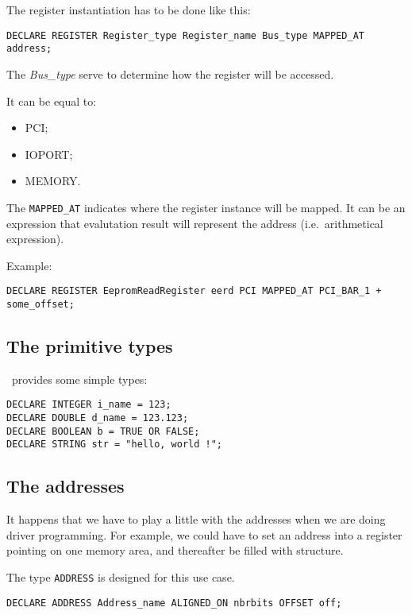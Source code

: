 \documentclass[american]{rtxreport}
\begin{document}
The register instantiation has to be done like this:
\begin{lstlisting}[caption=Register instanciation]
DECLARE REGISTER Register_type Register_name Bus_type MAPPED_AT address;
\end{lstlisting}

The \emph{Bus\_type} serve to determine how the register will be accessed.

It can be equal to:
\begin{itemize}
	\item PCI;
	\item IOPORT;
	\item MEMORY.
\end{itemize}

The \texttt{MAPPED\_AT} indicates where the register instance will be mapped. It can be an expression that evalutation result
will represent the address (i.e.\ arithmetical expression).


Example:
\begin{lstlisting}[caption=Example of MAPPED\_AT expression]
DECLARE REGISTER EepromReadRegister eerd PCI MAPPED_AT PCI_BAR_1 + some_offset;
\end{lstlisting}

\subsection{The primitive types}
\rtx\  provides some simple types:
\begin{lstlisting}[caption=Les types primitifs]
DECLARE INTEGER i_name = 123;
DECLARE DOUBLE d_name = 123.123;
DECLARE BOOLEAN b = TRUE OR FALSE;
DECLARE STRING str = "hello, world !";
\end{lstlisting}

\subsection{The addresses}

It happens that we have to play a little with the addresses when we are doing driver programming.
For example, we could have to set an address into a register pointing on one memory area, and thereafter be
filled with structure.


The type \texttt{ADDRESS} is designed for this use case.

\begin{lstlisting}[caption=ADDRESS instantiation]
DECLARE ADDRESS Address_name ALIGNED_ON nbrbits OFFSET off;
\end{lstlisting}
\end{document}
